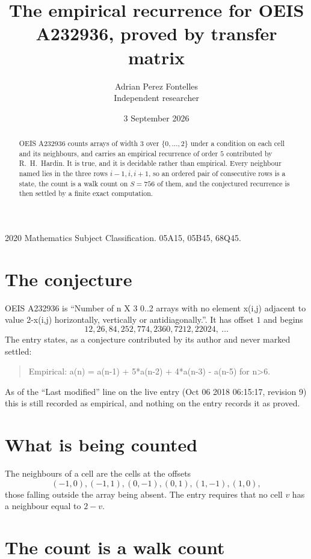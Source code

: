 \documentclass[11pt,a4paper]{article}
\title{The empirical recurrence for OEIS A232936, proved by transfer matrix}
\author{Adrian Perez Fontelles\\ \small Independent researcher}
\date{3 September 2026}
\theoremstyle{plain}
\theoremstyle{definition}
\begin{document}
\maketitle

\begin{abstract}
OEIS A232936 counts arrays of width $3$ over $\{0,\dots,2\}$ under a condition on each cell
and its neighbours, and carries an empirical recurrence of order $5$ contributed by
R.~H.~Hardin. It is true, and it is decidable rather than empirical. Every neighbour named lies
in the three rows $i-1,i,i+1$, so an ordered pair of consecutive rows is a state, the count is
a walk count on $S=756$ of them, and the conjectured recurrence is then settled by a finite
exact computation.
\end{abstract}

\noindent\small 2020 Mathematics Subject Classification. 05A15, 05B45, 68Q45.\normalsize

\section{The conjecture}

OEIS A232936 is ``Number of n X 3 0..2 arrays with no element x(i,j) adjacent to value 2-x(i,j) horizontally, vertically or antidiagonally.''. It has offset $1$ and begins
\[
12, 26, 84, 252, 774, 2360, 7212, 22024,\ \dots
\]
The entry states, as a conjecture contributed by its author and never marked settled:
\begin{quote}
Empirical: a(n) = a(n-1) + 5*a(n-2) + 4*a(n-3) - a(n-5) for n>6.
\end{quote}
As of the ``Last modified'' line on the live entry (Oct 06 2018 06:15:17, revision 9) this is still
recorded as empirical, and nothing on the entry records it as proved.

\section{What is being counted}

The neighbours of a cell are the cells at the offsets
\[
(-1,0), (-1,1), (0,-1), (0,1), (1,-1), (1,0),
\]
those falling outside the array being absent. The entry requires that no cell $v$ has a neighbour equal to $2-v$.

\section{The count is a walk count}
\end{document}
